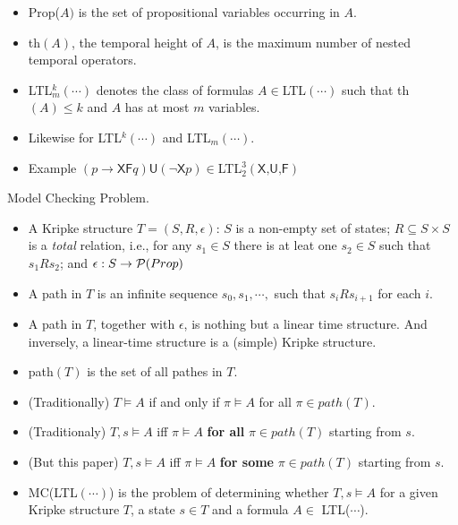 \documentclass[12pt]{article}
\begin{document}
\begin{itemize}
\item Prop($A)$ is the set of propositional variables occurring in $A$.

\item th$(A)$, the temporal height of $A$, is the maximum number of nested temporal operators.

\item LTL$^k_m(\cdots)$ denotes the class of  formulas $A\in$LTL$(\cdots)$ such that th$(A)\leq k$ and $A$ has at most $m$ variables.
\item Likewise for LTL$^k(\cdots)$ and LTL$_m(\cdots)$.
\item Example $(p\rightarrow \textsf{XF}q)\textsf{U}(\neg\textsf{X}p)\in$LTL$_2^3(\textsf{X,U,F})$
\end{itemize}


Model Checking Problem.

\begin{itemize}
\item A Kripke structure $T=(S, R,\epsilon)$: $S$ is a non-empty set of states; $R\subseteq S\times S$ is a {\em total} relation, i.e., for any $s_1\in S$ there is at leat one $s_2\in S$ such that $s_1Rs_2$; and $\epsilon: S\rightarrow {\cal P}(Prop)$
\item A path in $T$ is an infinite sequence $s_0, s_1,\cdots,$ such that $s_iRs_{i+1}$ for each $i$.

\item A path in $T$, together with $\epsilon$, is nothing but a linear time structure. And inversely, a linear-time structure is a (simple) Kripke structure.

\item path$(T)$ is the set of all pathes in $T$.

\item (Traditionally) $T\models A$ if and only if $\pi\models A$ for all $\pi\in path(T)$.
\item (Traditionaly) $T,s\models A$ iff $\pi\models A$ {\bf for all} $\pi\in path(T)$ starting from $s$.

\item (But this paper) $T,s\models A$ iff $\pi\models A$ {\bf for some} $\pi\in path(T)$ starting from $s$.

\item MC(LTL$(\cdots)$) is the problem of determining whether $T,s\models A$ for a given Kripke structure $T$, a state $s\in T$ and a formula $A\in$ LTL($\cdots$).
\end{itemize}
\end{document}
